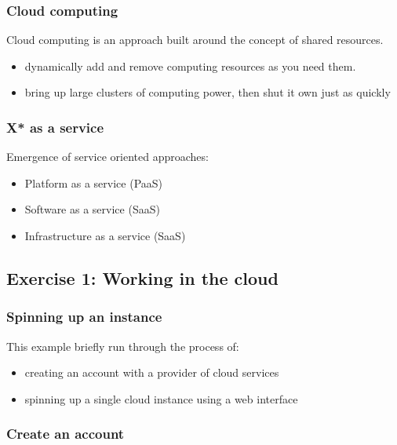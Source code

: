 \subsubsection{Cloud computing}\label{cloud-computing}

Cloud computing is an approach built around the concept of shared
resources.

\begin{itemize}
\itemsep1pt\parskip0pt
\item
  dynamically add and remove computing resources as you need them.
\item
  bring up large clusters of computing power, then shut it own just as
  quickly
\end{itemize}

\subsubsection{X* as a service}\label{x-as-a-service}

Emergence of service oriented approaches:

\begin{itemize}
\itemsep1pt\parskip0pt
\item
  Platform as a service (PaaS)
\item
  Software as a service (SaaS)
\item
  Infrastructure as a service (SaaS)
\end{itemize}

\subsection{Exercise 1: Working in the
cloud}\label{exercise-1-working-in-the-cloud}

\subsubsection{Spinning up an instance}\label{spinning-up-an-instance}

This example briefly run through the process of:

\begin{itemize}
\itemsep1pt\parskip0pt
\item
  creating an account with a provider of cloud services
\item
  spinning up a single cloud instance using a web interface
\end{itemize}

\subsubsection{Create an account}\label{create-an-account}

